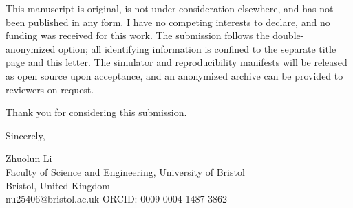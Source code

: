 \documentclass[10pt]{article}
\begin{document}
This manuscript is original, is not under consideration elsewhere,
and has not been published in any form. I have no competing
interests to declare, and no funding was received for this work.
The submission follows the double-anonymized option; all
identifying information is confined to the separate title page and
this letter. The simulator and reproducibility manifests will be
released as open source upon acceptance, and an anonymized archive
can be provided to reviewers on request.

Thank you for considering this submission.

Sincerely,

Zhuolun Li\\
Faculty of Science and Engineering, University of Bristol\\
Bristol, United Kingdom\\
nu25406@bristol.ac.uk \quad ORCID: 0009-0004-1487-3862
\end{document}
